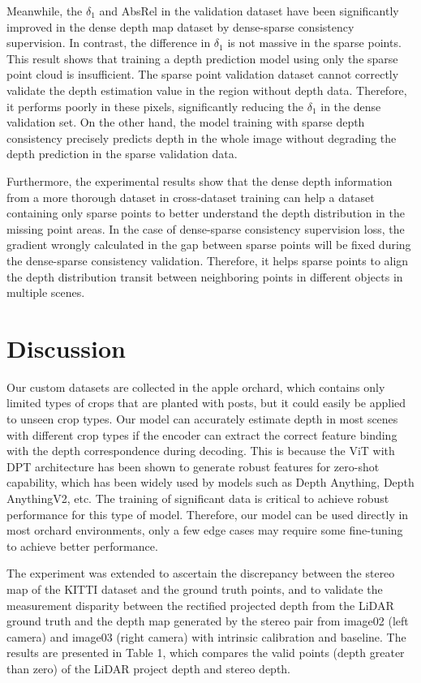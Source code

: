 \documentclass{article}
\begin{document}
        Meanwhile, the $\delta_1$ and AbsRel in the validation dataset have been significantly improved in the dense depth map dataset by dense-sparse consistency supervision. In contrast, the difference in $\delta_1$ is not massive in the sparse points. This result shows that training a depth prediction model using only the sparse point cloud is insufficient. The sparse point validation dataset cannot correctly validate the depth estimation value in the region without depth data. Therefore, it performs poorly in these pixels, significantly reducing the  $\delta_1$ in the dense validation set. On the other hand, the model training with sparse depth consistency precisely predicts depth in the whole image without degrading the depth prediction in the sparse validation data.

        Furthermore, the experimental results show that the dense depth information from a more thorough dataset in cross-dataset training can help a dataset containing only sparse points to better understand the depth distribution in the missing point areas. In the case of dense-sparse consistency supervision loss, the gradient wrongly calculated in the gap between sparse points will be fixed during the dense-sparse consistency validation. Therefore, it helps sparse points to align the depth distribution transit between neighboring points in different objects in multiple scenes.
    
\section{Discussion}
    Our custom datasets are collected in the apple orchard, which contains only limited types of crops that are planted with posts, but it could easily be applied to unseen crop types. Our model can accurately estimate depth in most scenes with different crop types if the encoder can extract the correct feature binding with the depth correspondence during decoding. This is because the ViT with DPT architecture has been shown to generate robust features for zero-shot capability, which has been widely used by models such as Depth Anything, Depth AnythingV2, etc. The training of significant data is critical to achieve robust performance for this type of model. Therefore, our model can be used directly in most orchard environments, only a few edge cases may require some fine-tuning to achieve better performance.
    
    The experiment was extended to ascertain the discrepancy between the stereo map of the KITTI dataset and the ground truth points, and to validate the measurement disparity between the rectified projected depth from the LiDAR ground truth and the depth map generated by the stereo pair from image02 (left camera) and image03 (right camera) with intrinsic calibration and baseline.  The results are presented in Table 1, which compares the valid points (depth greater than zero) of the LiDAR project depth and stereo depth.
    
\end{document}
